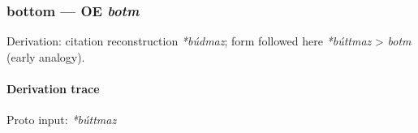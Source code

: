 \documentclass[
  british,
  a4paper,
]{article}
\begin{document}
\subsubsection{\texorpdfstring{bottom --- OE
\emph{botm}}{bottom --- OE botm}}\label{bottom-oe-botm}

Derivation: citation reconstruction \emph{*búdmaz}; form followed here
\emph{*búttmaz} \textgreater{} \emph{botm} (early analogy).

\paragraph{Derivation trace}\label{derivation-trace-111}

Proto input: \emph{*búttmaz}

\begingroup
\setlength{\fboxsep}{6pt}
\end{document}
